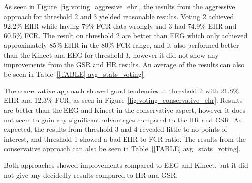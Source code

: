 As seen in Figure~\ref{fig:voting_aggresive_ehr}, the results from the aggressive approach for threshold 2 and 3 yielded reasonable results.
Voting 2 achieved 92.2\% EHR while having 79\% FCR data wrongly and 3 had 74.9\% EHR and 60.5\% FCR.
The result on threshold 2 are better than EEG which only achieved approximately 85\% EHR in the 80\% FCR range, and it
also performed better than the Kinect and EEG for threshold 3, however it did not show any improvements from the GSR and
HR results.
An average of the results can also be seen in Table~\ref{[TABLE] avg_stats_voting}

The conservative approach showed good tendencies at threshold 2 with 21.8\% EHR and 12.3\% FCR, as seen in Figure~\ref{fig:voting_conservative_ehr}.
Results are better than the EEG and Kinect in the conservative aspect, however it does not seem to gain any significant advantages compared to the HR and GSR.
As expected, the results from threshold 3 and 4 revealed little to no points of interest, and threshold 1 showed a bad EHR to FCR ratio. 
The results from the conservative approach can also be seen in Table~\ref{[TABLE] avg_stats_voting}.

Both approaches showed improvements compared to EEG and Kinect, but it did not give any decidedly results compared
to HR and GSR.


